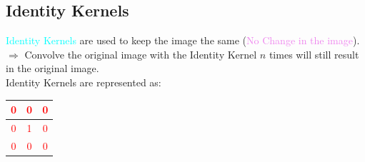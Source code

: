 \documentclass{book}
\begin{document}
\subsection{Identity Kernels}
\textcolor{cyan}{Identity Kernels} are used to keep the image the same (\textcolor{violet}{No Change in the image}).\\
$\Rightarrow$ Convolve the original image with the Identity Kernel $n$ times will still result in the original image.\\
Identity Kernels are represented as:
\begin{center}
    \textcolor{red}{
    \begin{tabular}{|c|c|c|}
        \hline
        0 & 0 & 0 \\
        \hline
        0 & 1 & 0 \\
        \hline
        0 & 0 & 0 \\
        \hline
    \end{tabular}}
\end{center}
\end{document}
